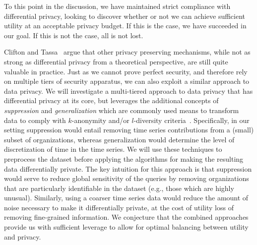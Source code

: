 To this point in the discussion, we have maintained strict compliance
with differential privacy, looking to discover whether or not we can
achieve sufficient utility at an acceptable privacy budget.  If this is
the case, we have succeeded in our goal.  If this is not the case, all
is not lost.

Clifton and Tassa~\cite{ct13} argue that other privacy preserving
mechanisms, while not as strong as differential privacy from a
theoretical perspective, are still quite valuable in practice.
Just as we cannot prove perfect security, and therefore rely on multiple
tiers of security apparatus, we can also exploit a similar approach
to data privacy.  
We will investigate a multi-tiered approach to data
privacy that has differential privacy at its core, but leverages the
additional concepts of \emph{suppression} and \emph{generalization}
which are commonly used means to transform data to comply with
$k$-anonymity and/or $l$-diversity criteria~\cite{mkgv07}.
Specifically, in our setting suppression would entail removing time
series contributions from a (small) subset of organizations, whereas
generalization would determine the level of discretization of time in
the time series.
We will use these techniques to preprocess the dataset
before applying the algorithms for making the resulting data
differentially private.
The key intuition for this approach is that suppression would serve to
reduce global sensitivity of the queries by removing organizations that are
particularly identifiable in the dataset (e.g., those which are highly
unusual).
Similarly, using a coarser time series data would reduce the amount of
noise necessary to make it differentially private, at the cost of utility loss
of removing fine-grained information.
We conjecture that the combined approaches provide us with sufficient
leverage to allow for optimal balancing between utility and privacy.


